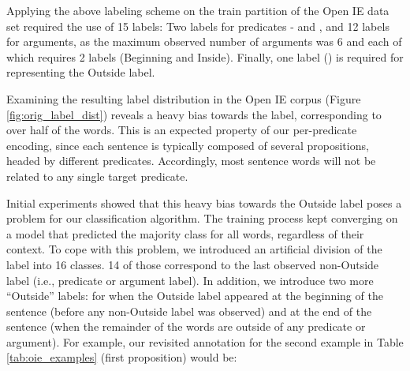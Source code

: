 



Applying the above labeling scheme on the train partition of the Open IE data set required the use
of 15 labels:
Two labels for predicates -  and , and 12 labels for arguments, as the maximum observed number of arguments was 6 and each of which requires 2 labels (Beginning and Inside). Finally, one label () is required for representing the Outside label.

Examining the resulting label distribution in the Open IE corpus (Figure \ref{fig:orig_label_dist})
reveals a heavy bias towards the  label, corresponding to over half of the words.
This is an expected property of our per-predicate encoding, since each sentence is typically composed of several propositions, headed by different predicates. Accordingly, most sentence words will not be related to any single target predicate. 

Initial experiments showed that this heavy bias towards the Outside label poses a problem for our classification algorithm.
The training process kept converging on a model that predicted the majority class for all words, regardless of their context.
To cope with this problem, we introduced an artificial division of the 
label into 16 classes. 14 of those correspond to the last observed non-Outside label (i.e., predicate or argument label).
In addition, we introduce two more ``Outside'' labels:  for when the Outside label appeared at the beginning of the sentence (before any non-Outside label was observed)
and  at the end of the sentence (when the remainder of the words are outside of any predicate or argument).
For example, our revisited annotation for the second example in Table \ref{tab:oie_examples} (first proposition) would be:

